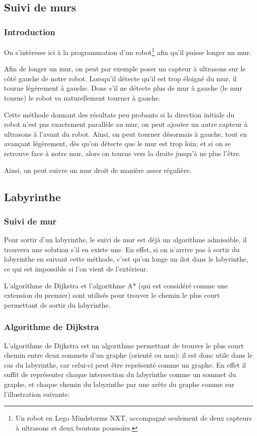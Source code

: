 \subsection{Suivi de murs}
  \subsubsection{Introduction}
  On s'intéresse ici à la programmation d'un robot\footnote{Un robot en Lego
  Mindstorms NXT, accompagné seulement de deux capteurs à ultrasons et
  deux boutons poussoirs.} afin qu'il puisse longer un mur.

  Afin de longer un mur, on peut par exemple poser un capteur à ultrasons sur
  le côté gauche de notre robot. Lorsqu'il détecte qu'il est trop
  éloigné du mur, il tourne légèrement à gauche. Donc s'il ne détecte plus
  de mur à gauche (le mur tourne) le robot va naturellement tourner à gauche.

  Cette méthode donnant des résultats peu probants si la direction initiale du
  robot n'est pas exactement parallèle au mur, on peut ajouter un autre capteur
  à ultrasons à l'avant du robot. Ainsi, on peut tourner désormais à gauche,
  tout en avançant légèrement, dès qu'on détecte que le mur est trop loin; et
  si on se retrouve face à notre mur, alors on tourne vers la droite jusqu'à ne
  plus l'être.

  Ainsi, on peut suivre un mur droit de manière assez régulière.

\subsection{Labyrinthe}\label{sec:laby}
  \subsubsection{Suivi de mur}
    Pour sortir d'un labyrinthe, le suivi de mur est déjà un algorithme
    admissible, il trouvera une solution s'il en existe une. En effet, si on
    n'arrive pas à sortir du labyrinthe en suivant cette méthode, c'est qu'on 
    longe un ilot dans le labyrinthe, ce qui est impossible si l'on vient
    de l'extérieur.

    L'algorithme de Dijkstra et l'algorithme A* (qui est considéré comme une
    extension du premier) sont utilisés pour trouver le chemin le plus court
    permettant de sortir du labyrinthe.

  \subsubsection{Algorithme de Dijkstra}
    L'algorithme de Dijkstra est un algorithme permettant de trouver le plus
    court chemin entre deux sommets d'un graphe (orienté ou non): il est donc
    utile dans le cas du labyrinthe, car celui-ci peut être représenté comme un
    graphe. En effet il suffit de représenter chaque intersection du labyrinthe
    comme un sommet du graphe, et chaque chemin du labyrinthe par une arête du
    graphe comme sur l'illustration suivante:

